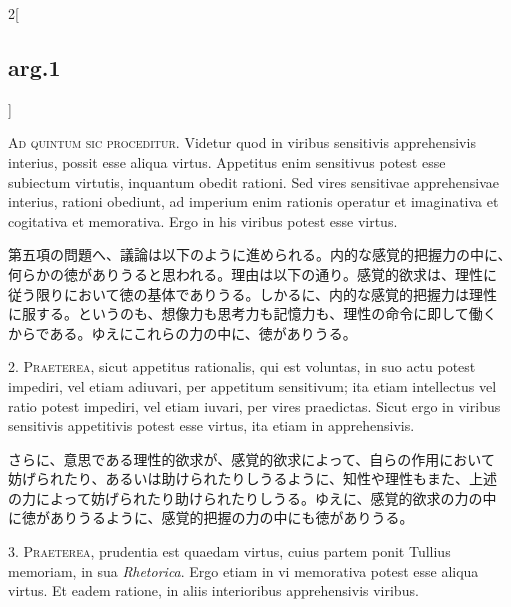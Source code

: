 \documentclass[paper=a4paper,fontsize=10pt,jafontsize=9pt,titlepage]{jlreq}
\begin{document}
\begin{paracol}{2}[\subsection{arg.1}]

{\scshape Ad quintum sic proceditur}. Videtur quod in viribus
sensitivis apprehensivis interius, possit esse aliqua
virtus. Appetitus enim sensitivus potest esse subiectum virtutis,
inquantum obedit rationi. Sed vires sensitivae apprehensivae interius,
rationi obediunt, ad imperium enim rationis operatur et imaginativa et
cogitativa et memorativa. Ergo in his viribus potest esse virtus.

\switchcolumn

第五項の問題へ、議論は以下のように進められる。内的な感覚的把握力の中に、
何らかの徳がありうると思われる。理由は以下の通り。感覚的欲求は、理性に
従う限りにおいて徳の基体でありうる。しかるに、内的な感覚的把握力は理性
に服する。というのも、想像力も思考力も記憶力も、理性の命令に即して働く
からである。ゆえにこれらの力の中に、徳がありうる。


2. {\scshape Praeterea}, sicut appetitus rationalis, qui est voluntas,
in suo actu potest impediri, vel etiam adiuvari, per appetitum
sensitivum; ita etiam intellectus vel ratio potest impediri, vel etiam
iuvari, per vires praedictas. Sicut ergo in viribus sensitivis
appetitivis potest esse virtus, ita etiam in apprehensivis.

\switchcolumn

さらに、意思である理性的欲求が、感覚的欲求によって、自らの作用において
妨げられたり、あるいは助けられたりしうるように、知性や理性もまた、上述
の力によって妨げられたり助けられたりしうる。ゆえに、感覚的欲求の力の中
に徳がありうるように、感覚的把握の力の中にも徳がありうる。


3. {\scshape Praeterea}, prudentia est quaedam virtus, cuius partem
ponit Tullius memoriam, in sua {\itshape Rhetorica}. Ergo etiam in vi
memorativa potest esse aliqua virtus. Et eadem ratione, in aliis
interioribus apprehensivis viribus.


\end{paracol}
\end{document}

